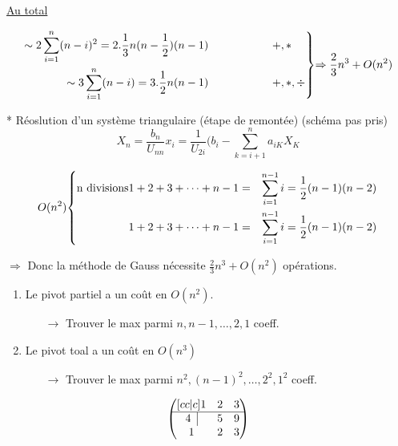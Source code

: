 \documentclass[a4paper,11pt]{article}
\newenvironment{rcases}
  {\left.\begin{aligned}}
  {\end{aligned}\right\rbrace}
\newenvironment{lcases}
  {\left\lbrace\begin{aligned}}
  {\end{aligned}\right.}
\theoremstyle{plain} %
\begin{document}
\underline{Au total}

\begin{equation*}
    \begin{rcases}
        \sim 2 \sum_{i=1}^n (n-i)^2 = 2.\frac{1}{3}n (n-\frac{1}{2})(n-1) \hspace{2cm}& +, *\\
        \sim 3 \sum_{i=1}^n (n-i) = 3.\frac{1}{2}n(n-1) \hspace{2cm} & +,*,\div
    \end{rcases}
    \text{$\Rightarrow \frac{2}{3}n^3+O(n^2)$}
\end{equation*}

* Réoslution d'un système triangulaire (étape de remontée)
(schéma pas pris)
\[
    X_n = \frac{b_n}{U_{nn}}
    x_i = \frac{1}{U_{2i}}(b_i - \sum_{k=i+1}^n a_{iK}X_K
\]

\begin{equation*}
    \text{$O(n^2)$}
    \begin{lcases}
        \text{n divisions}
        1 + 2 + 3 + \dots + n - 1 & = & \sum_{i=1}^{n-1}i = \frac{1}{2}(n-1)(n-2)\\
        1 + 2 + 3 + \dots + n - 1 & = & \sum_{i=1}^{n-1}i = \frac{1}{2}(n-1)(n-2)
    \end{lcases}
\end{equation*}

$\Rightarrow$ Donc la méthode de Gauss nécessite $\frac{2}{3}n^3+O(n^2)$ opérations.

\vspace{0.5cm}
\begin{remark}
    \begin{enumerate}
        \item Le pivot partiel a un coût en $O(n^2)$.
            \begin{itemize}
                \item [$\rightarrow$] Trouver le max parmi $n,n-1, \dots, 2, 1$ coeff.
            \end{itemize}

        \item Le pivot toal a un coût en $O(n^3)$
            \begin{itemize}
                \item [$\rightarrow$] Trouver le max parmi $n^2, (n-1)^2, \dots , 2^2, 1^2$ coeff.
            \end{itemize}
    \end{enumerate}
\end{remark}

\[
   \begin{pmatrix}[cc|c]
  1 & 2 & 3\\
  \hline
  4 \; \; \vline & 5 & 9 \\
  1 & 2 & 3
\end{pmatrix} 
\]
\end{document}
